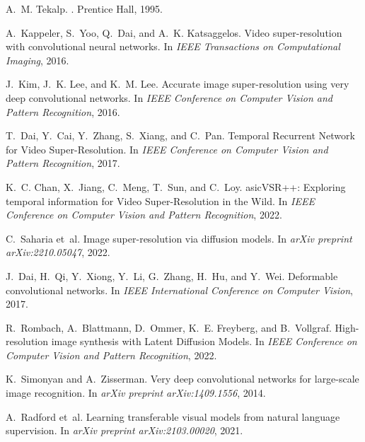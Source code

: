 \documentclass{article}
\begin{document}
\begin{thebibliography}{9}
A.~M. Tekalp.
.
\newblock Prentice Hall, 1995.

A.~Kappeler, S.~Yoo, Q.~Dai, and A.~K. Katsaggelos.
\newblock Video super-resolution with convolutional neural networks.
\newblock In {\em IEEE Transactions on Computational Imaging}, 2016.

J.~Kim, J.~K. Lee, and K.~M. Lee.
\newblock Accurate image super-resolution using very deep convolutional networks.
\newblock In {\em IEEE Conference on Computer Vision and Pattern Recognition}, 2016.

T.~Dai, Y.~Cai, Y.~Zhang, S.~Xiang, and C.~Pan.
\newblock Temporal {R}ecurrent {N}etwork for {V}ideo {S}uper-{R}esolution.
\newblock In {\em IEEE Conference on Computer Vision and Pattern Recognition}, 2017.

K.~C. Chan, X.~Jiang, C.~Meng, T.~Sun, and C.~Loy.
asic{VSR}++: {E}xploring temporal information for {V}ideo {S}uper-{R}esolution in the {W}ild.
\newblock In {\em IEEE Conference on Computer Vision and Pattern Recognition}, 2022.

C.~Saharia et~al.
\newblock Image super-resolution via diffusion models.
\newblock In {\em arXiv preprint arXiv:2210.05047}, 2022.

J.~Dai, H.~Qi, Y.~Xiong, Y.~Li, G.~Zhang, H.~Hu, and Y.~Wei.
\newblock Deformable convolutional networks.
\newblock In {\em IEEE International Conference on Computer Vision}, 2017.

R.~Rombach, A.~Blattmann, D.~Ommer, K.~E. Freyberg, and B.~Vollgraf.
\newblock High-resolution image synthesis with Latent Diffusion Models.
\newblock In {\em IEEE Conference on Computer Vision and Pattern Recognition}, 2022.

K.~Simonyan and A.~Zisserman.
\newblock Very deep convolutional networks for large-scale image recognition.
\newblock In {\em arXiv preprint arXiv:1409.1556}, 2014.

A.~Radford et~al.
\newblock Learning transferable visual models from natural language supervision.
\newblock In {\em arXiv preprint arXiv:2103.00020}, 2021.
\end{thebibliography}
\end{document}
